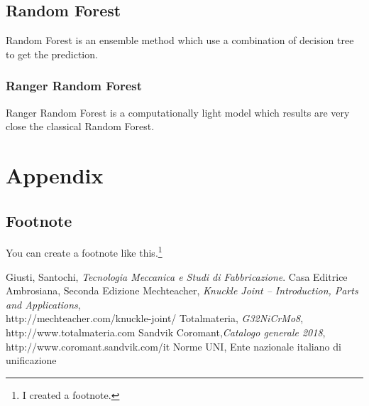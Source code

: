 \documentclass{FR16}
\begin{document}
\subsection{Random Forest}
Random Forest is an ensemble method which use a combination of decision tree to get the prediction.
\subsubsection{Ranger Random Forest}
Ranger Random Forest is a computationally light model which results are very close the classical Random Forest.
\\





\newpage
\section{Appendix}
%


%

\newpage


\subsection{Footnote}
You can create a footnote like this.\footnote{I created a footnote.}



\newpage
\begin{thebibliography}{9}
Giusti, Santochi, \emph{Tecnologia Meccanica e Studi di Fabbricazione}. Casa Editrice Ambrosiana, Seconda Edizione
Mechteacher, \emph{Knuckle Joint – Introduction, Parts and Applications},\\ http://mechteacher.com/knuckle-joint/
Totalmateria, \emph{G32NiCrMo8}, http://www.totalmateria.com 
Sandvik Coromant,\emph{Catalogo  generale  2018},   http://www.coromant.sandvik.com/it
Norme UNI, Ente nazionale italiano di unificazione
\end{thebibliography}
\end{document}

